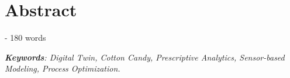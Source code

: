 \chapter*{Abstract}
 - 180 words 


\textit{\textbf{Keywords}: Digital Twin, Cotton Candy, Prescriptive Analytics, Sensor-based Modeling, Process Optimization.}
